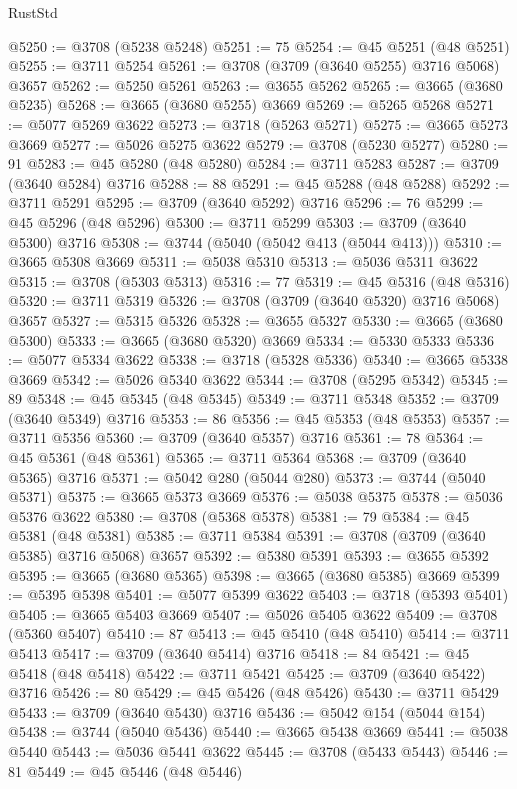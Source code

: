 \begin{lexlean}{RustStd}
\begin{coremodule}
@5250 := @3708 (@5238 @5248)
@5251 := 75
@5254 := @45 @5251 (@48 @5251)
@5255 := @3711 @5254
@5261 := @3708 (@3709 (@3640 @5255) @3716 @5068) @3657
@5262 := @5250 @5261
@5263 := @3655 @5262
@5265 := @3665 (@3680 @5235)
@5268 := @3665 (@3680 @5255) @3669
@5269 := @5265 @5268
@5271 := @5077 @5269 @3622
@5273 := @3718 (@5263 @5271)
@5275 := @3665 @5273 @3669
@5277 := @5026 @5275 @3622
@5279 := @3708 (@5230 @5277)
@5280 := 91
@5283 := @45 @5280 (@48 @5280)
@5284 := @3711 @5283
@5287 := @3709 (@3640 @5284) @3716
@5288 := 88
@5291 := @45 @5288 (@48 @5288)
@5292 := @3711 @5291
@5295 := @3709 (@3640 @5292) @3716
@5296 := 76
@5299 := @45 @5296 (@48 @5296)
@5300 := @3711 @5299
@5303 := @3709 (@3640 @5300) @3716
@5308 := @3744 (@5040 (@5042 @413 (@5044 @413)))
@5310 := @3665 @5308 @3669
@5311 := @5038 @5310
@5313 := @5036 @5311 @3622
@5315 := @3708 (@5303 @5313)
@5316 := 77
@5319 := @45 @5316 (@48 @5316)
@5320 := @3711 @5319
@5326 := @3708 (@3709 (@3640 @5320) @3716 @5068) @3657
@5327 := @5315 @5326
@5328 := @3655 @5327
@5330 := @3665 (@3680 @5300)
@5333 := @3665 (@3680 @5320) @3669
@5334 := @5330 @5333
@5336 := @5077 @5334 @3622
@5338 := @3718 (@5328 @5336)
@5340 := @3665 @5338 @3669
@5342 := @5026 @5340 @3622
@5344 := @3708 (@5295 @5342)
@5345 := 89
@5348 := @45 @5345 (@48 @5345)
@5349 := @3711 @5348
@5352 := @3709 (@3640 @5349) @3716
@5353 := 86
@5356 := @45 @5353 (@48 @5353)
@5357 := @3711 @5356
@5360 := @3709 (@3640 @5357) @3716
@5361 := 78
@5364 := @45 @5361 (@48 @5361)
@5365 := @3711 @5364
@5368 := @3709 (@3640 @5365) @3716
@5371 := @5042 @280 (@5044 @280)
@5373 := @3744 (@5040 @5371)
@5375 := @3665 @5373 @3669
@5376 := @5038 @5375
@5378 := @5036 @5376 @3622
@5380 := @3708 (@5368 @5378)
@5381 := 79
@5384 := @45 @5381 (@48 @5381)
@5385 := @3711 @5384
@5391 := @3708 (@3709 (@3640 @5385) @3716 @5068) @3657
@5392 := @5380 @5391
@5393 := @3655 @5392
@5395 := @3665 (@3680 @5365)
@5398 := @3665 (@3680 @5385) @3669
@5399 := @5395 @5398
@5401 := @5077 @5399 @3622
@5403 := @3718 (@5393 @5401)
@5405 := @3665 @5403 @3669
@5407 := @5026 @5405 @3622
@5409 := @3708 (@5360 @5407)
@5410 := 87
@5413 := @45 @5410 (@48 @5410)
@5414 := @3711 @5413
@5417 := @3709 (@3640 @5414) @3716
@5418 := 84
@5421 := @45 @5418 (@48 @5418)
@5422 := @3711 @5421
@5425 := @3709 (@3640 @5422) @3716
@5426 := 80
@5429 := @45 @5426 (@48 @5426)
@5430 := @3711 @5429
@5433 := @3709 (@3640 @5430) @3716
@5436 := @5042 @154 (@5044 @154)
@5438 := @3744 (@5040 @5436)
@5440 := @3665 @5438 @3669
@5441 := @5038 @5440
@5443 := @5036 @5441 @3622
@5445 := @3708 (@5433 @5443)
@5446 := 81
@5449 := @45 @5446 (@48 @5446)

\end{coremodule}
\end{lexlean}
